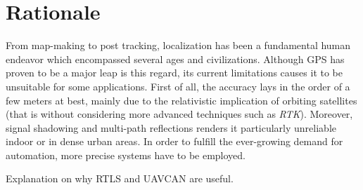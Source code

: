 \section{Rationale}

From map-making to post tracking, localization has been a fundamental human endeavor which encompassed several ages and civilizations.
Although GPS has proven to be a major leap is this regard, its current limitations causes it to be unsuitable for some applications.
First of all, the accuracy lays in the order of a few meters at best, mainly due to the relativistic implication of orbiting satellites \cite{gps1} (that is without considering more advanced techniques such as \emph{RTK}).
Moreover, signal shadowing and multi-path reflections renders it particularly unreliable indoor or in dense urban areas.
In order to fulfill the ever-growing demand for automation, more precise systems have to be employed.


Explanation on why RTLS and UAVCAN are useful.
